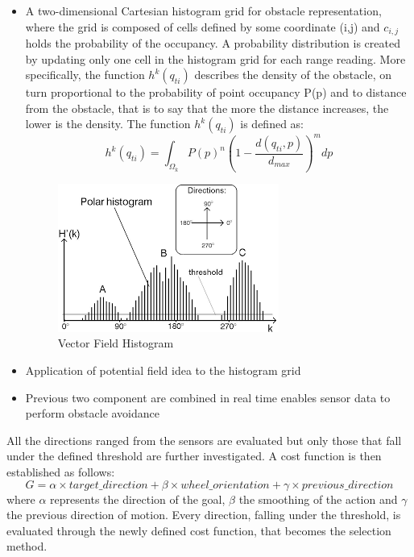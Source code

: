 \begin{itemize}
    \item A two-dimensional Cartesian histogram grid for obstacle representation, where the grid is composed of cells defined by some coordinate (i,j) and $c_{i,j}$ holds the probability of the occupancy. A probability distribution is created by updating only one cell in the histogram grid for each range reading.
    More specifically, the function $h^k(q_{ti})$ describes the density of the obstacle, on turn proportional to the probability of point occupancy P(p) and to distance from the obstacle, that is to say that the more the distance increases, the lower is the density.
    The function $h^k(q_{ti})$ is defined as:
    \begin{equation}
        h^k(q_{ti}) = \int_{\Omega_k} P(p)^n\left(1 - \frac{d(q_{ti},p)}{d_{max}}\right)^m dp
    \end{equation}
    \begin{figure}[H]
        \centering
        \includegraphics{Images/Chapter 4/potentialfield.png}
        \caption{Vector Field Histogram}
        \label{fig:my_label}
    \end{figure}
    \item Application of potential field idea to the histogram grid
    \item Previous two component are combined in real time enables sensor data to perform obstacle avoidance
\end{itemize}
All the directions ranged from the sensors are evaluated but only those that fall under the defined threshold are further investigated. A cost function is then established as follows:
\begin{equation}
    G = \alpha \times target\_direction + \beta \times  wheel\_orientation + \gamma \times previous\_direction
\end{equation}
where $\alpha$ represents the direction of the goal, $\beta$ the smoothing of the action and $\gamma$ the previous direction of motion.
Every direction, falling under the threshold, is evaluated through the newly defined cost function, that becomes the selection method.

